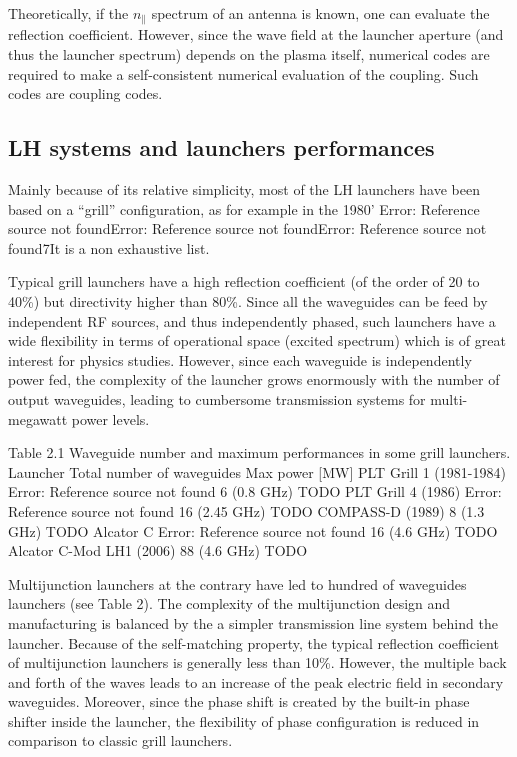 Theoretically, if the $n_{\parallel}$ spectrum of an antenna is known, one can evaluate the reflection coefficient. However, since the wave field at the launcher aperture (and thus the launcher spectrum) depends on the plasma itself, numerical codes are required to make a self-consistent numerical evaluation of the coupling. Such codes are coupling codes.

\subsection{LH systems and launchers performances}
Mainly because of its relative simplicity, most of the LH launchers have been based on a “grill” configuration, as for example in the 1980' Error: Reference source not foundError: Reference source not foundError: Reference source not found7It is a non exhaustive list.

Typical grill launchers have a high reflection coefficient (of the order of 20 to 40\%) but directivity higher than 80\%. Since all the waveguides can be feed by independent RF sources, and thus independently phased, such launchers have a wide flexibility in terms of operational space (excited spectrum) which is of great interest for physics studies. However, since each waveguide is independently power fed, the complexity of the launcher grows enormously with the number of output waveguides, leading to cumbersome transmission systems for multi-megawatt power levels. 

Table 2.1 Waveguide number and maximum performances in some grill launchers.
Launcher
Total number of waveguides
Max power [MW]
PLT Grill 1 (1981-1984) Error: Reference source not found
6 (0.8 GHz)
TODO
PLT Grill 4 (1986) Error: Reference source not found
16 (2.45 GHz)
TODO
COMPASS-D (1989)
8 (1.3 GHz)
TODO
Alcator C Error: Reference source not found
16 (4.6 GHz)
TODO
Alcator C-Mod LH1 (2006)
88 (4.6 GHz)
TODO

Multijunction launchers at the contrary have led to hundred of waveguides launchers (see Table 2). The complexity of the multijunction design and manufacturing is balanced by the a simpler transmission line system behind the launcher. Because of the self-matching property, the typical reflection coefficient of multijunction launchers is generally less than 10\%. However, the multiple back and forth of the waves leads to an increase of the peak electric field in secondary waveguides. Moreover, since the phase shift is created by the built-in phase shifter inside the launcher, the flexibility of phase configuration is reduced in comparison to classic grill launchers. 

